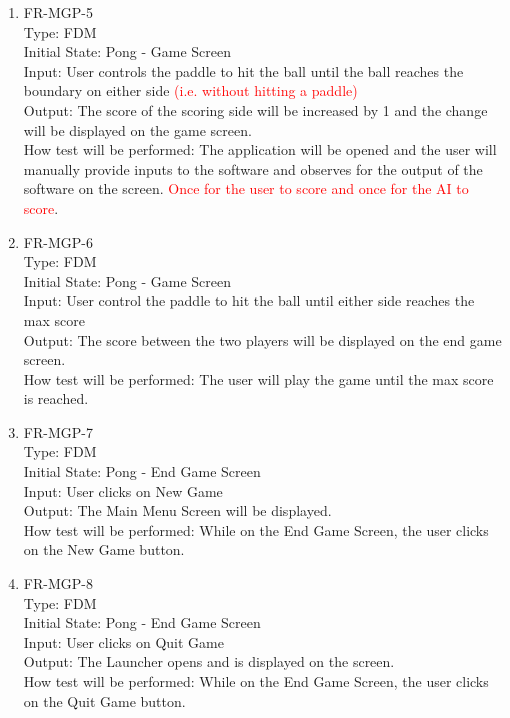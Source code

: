 \documentclass[12pt, titlepage]{article}
\begin{document}
\begin{enumerate}
\item{FR-MGP-5\\}
Type: FDM\\
Initial State: Pong - Game Screen\\
Input: User controls the paddle to hit the ball until the ball reaches the boundary on either side \textcolor{red}{(i.e. without hitting a paddle)}\\
Output: The score of the scoring side will be increased by 1 and the change will be displayed on the game screen.\\
How test will be performed: The application will be opened and the user will manually provide inputs to the software and observes for the output of the software on the screen. \textcolor{red}{Once for the user to score and once for the AI to score}.\\

\item{FR-MGP-6\\}
Type: FDM\\
Initial State: Pong - Game Screen\\
Input: User control the paddle to hit the ball until either side reaches the max score\\
Output: The score between the two players will be displayed on the end game screen.\\
How test will be performed: The user will play the game until the max score is reached.\\

\item{FR-MGP-7\\}
Type: FDM\\
Initial State: Pong - End Game Screen\\
Input: User clicks on New Game\\
Output: The Main Menu Screen will be displayed.\\
How test will be performed: While on the End Game Screen, the user clicks on the New Game button.\\

\item{FR-MGP-8\\}
Type: FDM\\
Initial State: Pong - End Game Screen\\
Input: User clicks on Quit Game\\
Output: The Launcher opens and is displayed on the screen.\\
How test will be performed: While on the End Game Screen, the user clicks on the Quit Game button.\\


\end{enumerate}
\end{document}
